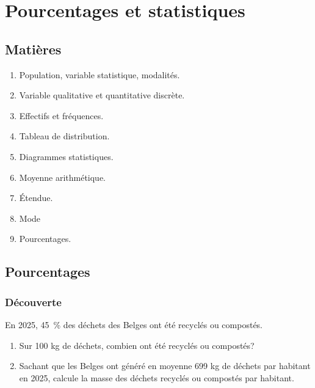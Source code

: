 \documentclass[../../syllabus_1.tex]{subfiles}
\begin{document}
\chapter{Pourcentages et statistiques}

\section*{Matières}
\begin{enumerate}[label=\textbf{\arabic*.}]
    \item Population, variable statistique, modalités.
    \item Variable qualitative et quantitative discrète.
    \item Effectifs et fréquences.
    \item Tableau de distribution.
    \item Diagrammes statistiques.
    \item Moyenne arithmétique.
    \item Étendue.
    \item Mode
    \item Pourcentages.
\end{enumerate}

\section{Pourcentages}
\subsection{Découverte}

\begin{exercise}
    En 2025, \SI{45}{\%} des déchets des Belges ont été recyclés ou compostés.
    \begin{enumerate}[itemsep=2cm]
        \item Sur 100 kg de déchets, combien ont été recyclés ou compostés?
        \item Sachant que les Belges ont généré en moyenne 699 kg de déchets par habitant en 2025, calcule la masse des déchets recyclés ou compostés par habitant.
    \end{enumerate}
    \vspace{1.7cm}
\end{exercise}
\end{document}
